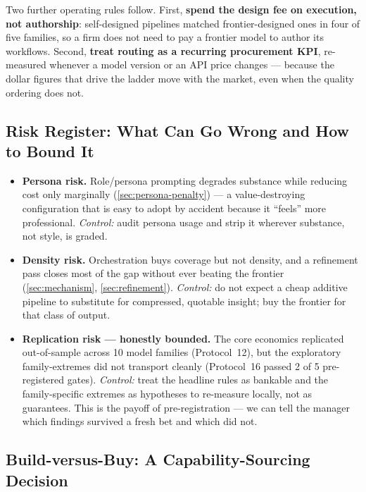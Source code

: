 \documentclass[12pt,a4paper]{article}
\begin{document}
Two further operating rules follow. First, \textbf{spend the design fee on
execution, not authorship}: self-designed pipelines matched frontier-designed
ones in four of five families, so a firm does not need to pay a frontier model to
author its workflows. Second, \textbf{treat routing as a recurring procurement
KPI}, re-measured whenever a model version or an API price changes --- because the
dollar figures that drive the ladder move with the market, even when the quality
ordering does not.

\subsection{Risk Register: What Can Go Wrong and How to Bound It}

\begin{itemize}[leftmargin=*,nosep]
  \item \textbf{Persona risk.} Role/persona prompting degrades substance while
        reducing cost only marginally (\cref{sec:persona-penalty}) --- a value-destroying
        configuration that is easy to adopt by accident because it ``feels'' more
        professional. \emph{Control:} audit persona usage and strip it wherever
        substance, not style, is graded.
  \item \textbf{Density risk.} Orchestration buys coverage but not density, and a
        refinement pass closes most of the gap without ever beating the frontier
        (\cref{sec:mechanism}, \cref{sec:refinement}). \emph{Control:} do not
        expect a cheap additive pipeline to substitute for compressed, quotable
        insight; buy the frontier for that class of output.
  \item \textbf{Replication risk --- honestly bounded.} The core economics
        replicated out-of-sample across 10 model families (Protocol~12), but the
        exploratory family-extremes did not transport cleanly (Protocol~16 passed
        2 of 5 pre-registered gates). \emph{Control:} treat the headline rules as
        bankable and the family-specific extremes as hypotheses to re-measure
        locally, not as guarantees. This is the payoff of pre-registration --- we
        can tell the manager which findings survived a fresh bet and which did not.
\end{itemize}

\subsection{Build-versus-Buy: A Capability-Sourcing Decision}
\end{document}
